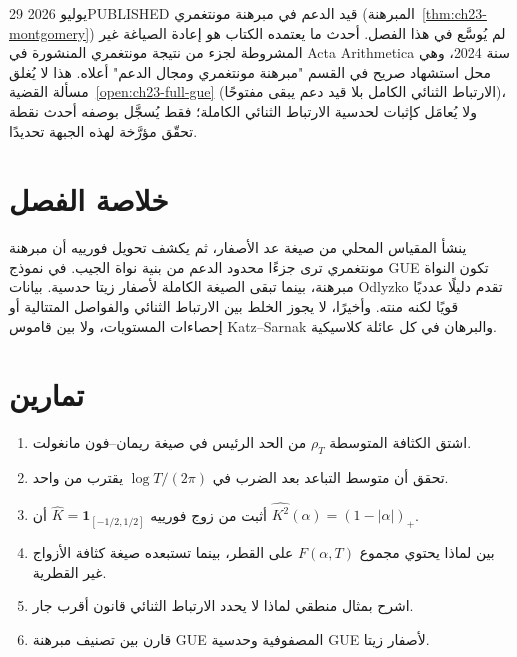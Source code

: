 \begin{frontiercard}{29 يوليو 2026}{PUBLISHED}{\cite{baluyot2024unconditional}}
قيد الدعم في مبرهنة مونتغمري (المبرهنة~\ref{thm:ch23-montgomery}) لم يُوسَّع في هذا الفصل. أحدث ما يعتمده الكتاب هو إعادة الصياغة غير المشروطة لجزء من نتيجة مونتغمري المنشورة في \textenglish{Acta Arithmetica} سنة 2024، وهي محل استشهاد صريح في القسم "مبرهنة مونتغمري ومجال الدعم" أعلاه. هذا لا يُغلق مسألة القضية~\ref{open:ch23-full-gue} (الارتباط الثنائي الكامل بلا قيد دعم يبقى مفتوحًا)، ولا يُعامَل كإثبات لحدسية الارتباط الثنائي الكاملة؛ فقط يُسجَّل بوصفه أحدث نقطة تحقّق مؤرَّخة لهذه الجبهة تحديدًا.
\end{frontiercard}

\section*{خلاصة الفصل}

ينشأ المقياس المحلي من صيغة عد الأصفار، ثم يكشف تحويل فورييه أن مبرهنة مونتغمري ترى جزءًا محدود الدعم من بنية نواة الجيب. في نموذج GUE تكون النواة مبرهنة، بينما تبقى الصيغة الكاملة لأصفار زيتا حدسية. بيانات Odlyzko تقدم دليلًا عدديًا قويًا لكنه منته. وأخيرًا، لا يجوز الخلط بين الارتباط الثنائي والفواصل المتتالية أو إحصاءات المستويات، ولا بين قاموس Katz--Sarnak والبرهان في كل عائلة كلاسيكية.

\section*{تمارين}
\begin{enumerate}
  \item اشتق الكثافة المتوسطة \(\rho_T\) من الحد الرئيس في صيغة ريمان--فون مانغولت.
  \item تحقق أن متوسط التباعد بعد الضرب في \(\log T/(2\pi)\) يقترب من واحد.
  \item أثبت من زوج فورييه \(\widehat K=\mathbf 1_{[-1/2,1/2]}\) أن \(\widehat{K^2}(\alpha)=(1-|\alpha|)_+\).
  \item بين لماذا يحتوي مجموع \(F(\alpha,T)\) على القطر، بينما تستبعده صيغة كثافة الأزواج غير القطرية.
  \item اشرح بمثال منطقي لماذا لا يحدد الارتباط الثنائي قانون أقرب جار.
  \item قارن بين تصنيف مبرهنة GUE المصفوفية وحدسية GUE لأصفار زيتا.
\end{enumerate}
